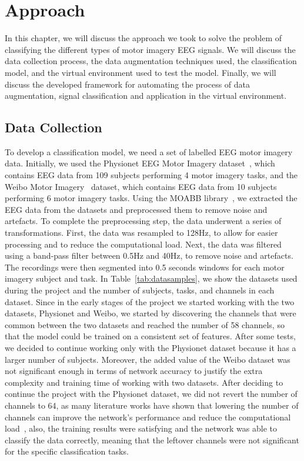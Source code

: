 \chapter{Approach}\label{ch:approach}
In this chapter, we will discuss the approach we took to solve the problem of classifying the different types of motor imagery EEG signals.
We will discuss the data collection process, the data augmentation techniques used, the classification model, and the virtual environment used to test the model. 
Finally, we will discuss the developed framework for automating the process of data augmentation, signal classification and application in the virtual environment.

\section{Data Collection}
To develop a classification model, we need a set of labelled EEG motor imagery data.
Initially, we used the Physionet EEG Motor Imagery dataset~\cite{goldberger2000physiobank}, which contains EEG data from 109 subjects performing 4 motor imagery tasks, and the Weibo Motor Imagery~\cite{yi2014evaluation} dataset, which contains EEG data from 10 subjects performing 6 motor imagery tasks.
Using the MOABB library~\cite{Aristimunha_Mother_of_all_2023, chevallier2024largest, jayaram2018moabb}, we extracted the EEG data from the datasets and preprocessed them to remove noise and artefacts.
To complete the preprocessing step, the data underwent a series of transformations.
First, the data was resampled to 128Hz, to allow for easier processing and to reduce the computational load.
Next, the data was filtered using a band-pass filter between 0.5Hz and 40Hz, to remove noise and artefacts.
The recordings were then segmented into 0.5 seconds windows for each motor imagery subject and task.
In Table~\ref{tab:datasamples}, we show the datasets used during the project and the number of subjects, tasks, and channels in each dataset.
Since in the early stages of the project we started working with the two datasets, Physionet and Weibo, we started by discovering the channels that were common between the two datasets and reached the number of 58 channels, so that the model could be trained on a consistent set of features.
After some tests, we decided to continue working only with the Physionet dataset because it has a larger number of subjects.
Moreover, the added value of the Weibo dataset was not significant enough in terms of network accuracy to justify the extra complexity and training time of working with two datasets.
After deciding to continue the project with the Physionet dataset, we did not revert the number of channels to 64, as many literature works have shown that lowering the number of channels can improve the network's performance and reduce the computational load~\cite{faye2022eeg}, also, the training results were satisfying and the network was able to classify the data correctly, meaning that the leftover channels were not significant for the specific classification tasks.

